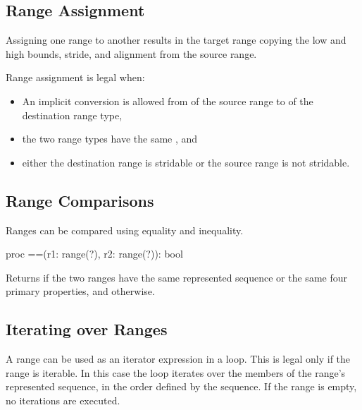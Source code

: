 \subsection{Range Assignment}
\label{Range_Assignment}

Assigning one range to another results in the target range
copying the low and high bounds, stride, and alignment
from the source range.

Range assignment is legal when:
\begin{itemize}
\item An implicit conversion is allowed from  of the source range
       to  of the destination range type,
\item the two range types have the same , and
\item either the destination range is stridable or the source range
      is not stridable.
\end{itemize}

\subsection{Range Comparisons}
\label{Range_Comparisons}

Ranges can be compared using equality and inequality.

\begin{protohead}
proc ==(r1: range(?), r2: range(?)): bool
\end{protohead}
\begin{protobody}
Returns  if the two ranges have the same represented sequence
or the same four primary properties,
and  otherwise.
\end{protobody}

\subsection{Iterating over Ranges}
\label{Iterating_over_Ranges}

A range can be used as an iterator expression in a loop. This is legal
only if the range is iterable. In this case the loop iterates over the
members of the range's represented sequence, in the order defined by
the sequence. If the range is empty, no iterations are executed.

